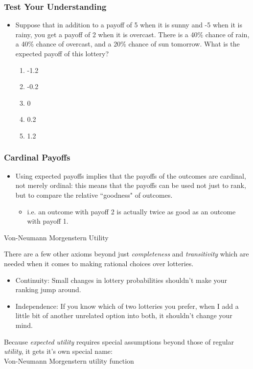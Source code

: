 
\begin{frame}
\frametitle{Test Your Understanding}
\begin{itemize}
\item Suppose that in addition to a payoff of 5 when it is sunny and -5 when it is rainy, you get a payoff of 2 when it is overcast. There is a 40\% chance of rain, a 40\% chance of overcast, and a 20\% chance of sun tomorrow. What is the expected payoff of this lottery?
\begin{enumerate}
	\item -1.2
	\item -0.2
	\item 0
	\item 0.2
	\item 1.2
\end{enumerate}
\end{itemize}
\end{frame}


\begin{frame}
\frametitle{Cardinal Payoffs}
\begin{itemize}
\item Using expected payoffs implies that the payoffs of the outcomes are \alert{cardinal}, not merely ordinal: this means that the payoffs can be used not just to rank, but to compare the relative ``goodness" of outcomes.
\begin{itemize}
	\item i.e. an outcome with payoff 2 is actually twice as good as an outcome with payoff 1.
\end{itemize}
\end{itemize}
\end{frame}

\begin{frame}{Von-Neumann Morgenstern Utility}

  There are a few other axioms beyond just \textit{completeness} and \textit{transitivity}
  which are needed when it comes to making rational choices over lotteries.

  \begin{itemize}
    \item \alert{Continuity:} Small changes in lottery probabilities shouldn't make your ranking jump around.
    \item \alert{Independence:} If you know which of two lotteries you prefer, when I add a little bit of another unrelated option into both, it shouldn't change your mind.
  \end{itemize}

  Because \textit{expected utility} requires special assumptions beyond those of regular \textit{utility}, 
  it gets it's own special name: \\
  \alert{Von-Neumann Morgenstern utility function}
\end{frame}

